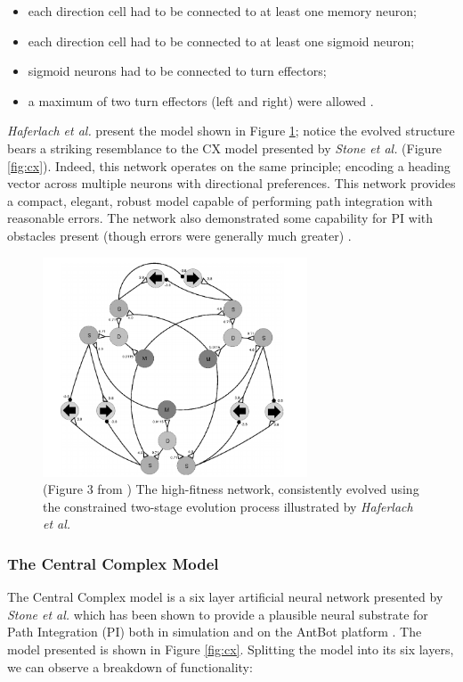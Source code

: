 \documentclass[a4paper,11pt,twoside,openright]{article}
\begin{document}
\begin{itemize}
\item{each direction cell had to be connected to at least one memory neuron;}
\item{each direction cell had to be connected to at least one sigmoid neuron;}
\item{sigmoid neurons had to be connected to turn effectors;}
\item{a maximum of two turn effectors (left and right) were allowed
  \cite{Haferlach2007}.}
\end{itemize}


\textit{Haferlach et al.} present the model shown in Figure
\ref{fig:evolvednetwork}; notice the evolved structure bears a striking
resemblance to the CX model presented by \textit{Stone et al.} (Figure
\ref{fig:cx}). Indeed, this network operates on the same principle; encoding
a heading vector across multiple neurons with directional preferences. This
network provides a compact, elegant, robust model capable of performing
path integration with reasonable errors. The network also demonstrated
some capability for PI with obstacles present (though errors were generally much
greater) \cite{Haferlach2007}.

\begin{figure}[h!]
  \centering
  \includegraphics[width=0.7\textwidth]{EvolvedNetwork}
  \caption{\label{fig:evolvednetwork} (Figure 3 from \cite{Haferlach2007})
    The high-fitness network, consistently evolved using the constrained
    two-stage evolution process illustrated by \textit{Haferlach et al.}
  }
\end{figure}

\subsubsection{The Central Complex Model}
The Central Complex model is a six layer artificial neural network
presented by \textit{Stone et al.} which has been shown to provide a
plausible neural substrate for Path Integration (PI) both in
simulation and on the AntBot platform \cite{Scimeca2017,
  Stone2017}. The model presented is shown in Figure
\ref{fig:cx}. Splitting the model into its six layers, we can observe
a breakdown of functionality:
\newline
\par
\end{document}
